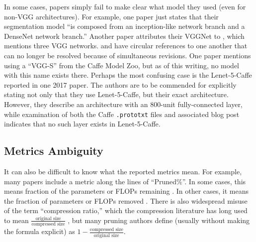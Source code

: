 In some cases, papers simply fail to make clear what model they used (even for non-VGG architectures). For example, one paper just states that their segmentation model ``is composed from an inception-like network branch and a DenseNet network branch.'' Another paper attributes their VGGNet to \cite{deepFaceRecognition}, which mentions three VGG networks. \citet{rethinking-net-pruning} and \citet{lottery-ticket} have circular references to one another that can no longer be resolved because of simultaneous revisions. One paper mentions using a ``VGG-S'' from the Caffe Model Zoo, but as of this writing, no model with this name exists there. Perhaps the most confusing case is the Lenet-5-Caffe reported in one 2017 paper. The authors are to be commended for explicitly stating not only that they use Lenet-5-Caffe, but their exact architecture. However, they describe an architecture with an 800-unit fully-connected layer, while examination of both the Caffe \texttt{.prototxt} files \cite{lenet-5-proto1, lenet-5-proto2} and associated blog post \cite{lenet-5-caffe} indicates that no such layer exists in Lenet-5-Caffe.


\subsection{Metrics Ambiguity} \label{sec:otherAmbiguity}


It can also be difficult to know what the reported metrics mean. For example, many papers include a metric along the lines of ``Pruned\%''. In some cases, this means fraction of the parameters or FLOPs remaining \cite{apple-pfa}. In other cases, it means the fraction of parameters or FLOPs removed \cite{learning-both, lempitsky-fast-convnets, balanced-sparsity}. There is also widespread misuse of the term ``compression ratio,'' which the compression literature has long used to mean $\frac{\text{original size}}{\text{compressed size}}$ \cite{bbp, pfor, groupSimd, zfp, dfcm, sprintz}, but many pruning authors define (usually without making the formula explicit) as $1 - \frac{\text{compressed size}}{\text{original size}}$.

